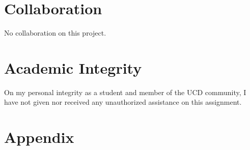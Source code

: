 \documentclass[a4paper,12pt]{article}
\begin{document}
\section{Collaboration}
No collaboration on this project.


\section{Academic Integrity}
On my personal integrity as a student and member of the UCD community, I have not given nor received any unauthorized assistance on this assignment.


\section{Appendix}



\end{document}
